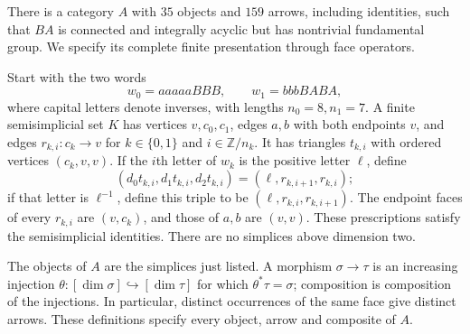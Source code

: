 \begin{example}\label{A:audit-acyclic}
There is a category $A$ with $35$ objects and $159$ arrows, including identities, such that $BA$ is connected and integrally acyclic but has nontrivial fundamental group. We specify its complete finite presentation through face operators.

Start with the two words
\[
 w_0=aaaaaBBB,\qquad w_1=bbbBABA,
\]
where capital letters denote inverses, with lengths $n_0=8,n_1=7$. A finite semisimplicial set $K$ has vertices $v,c_0,c_1$, edges $a,b$ with both endpoints $v$, and edges $r_{k,i}:c_k\to v$ for $k\in\{0,1\}$ and $i\in\mathbb Z/n_k$. It has triangles $t_{k,i}$ with ordered vertices $(c_k,v,v)$. If the $i$th letter of $w_k$ is the positive letter $\ell$, define
\[
 (d_0t_{k,i},d_1t_{k,i},d_2t_{k,i})
 =(\ell,r_{k,i+1},r_{k,i});
\]
if that letter is $\ell^{-1}$, define this triple to be $(\ell,r_{k,i},r_{k,i+1})$. The endpoint faces of every $r_{k,i}$ are $(v,c_k)$, and those of $a,b$ are $(v,v)$. These prescriptions satisfy the semisimplicial identities. There are no simplices above dimension two.

The objects of $A$ are the simplices just listed. A morphism $\sigma\to\tau$ is an increasing injection $\theta:[\dim\sigma]\hookrightarrow[\dim\tau]$ for which $\theta^*\tau=\sigma$; composition is composition of the injections. In particular, distinct occurrences of the same face give distinct arrows. These definitions specify every object, arrow and composite of $A$.
\end{example}


